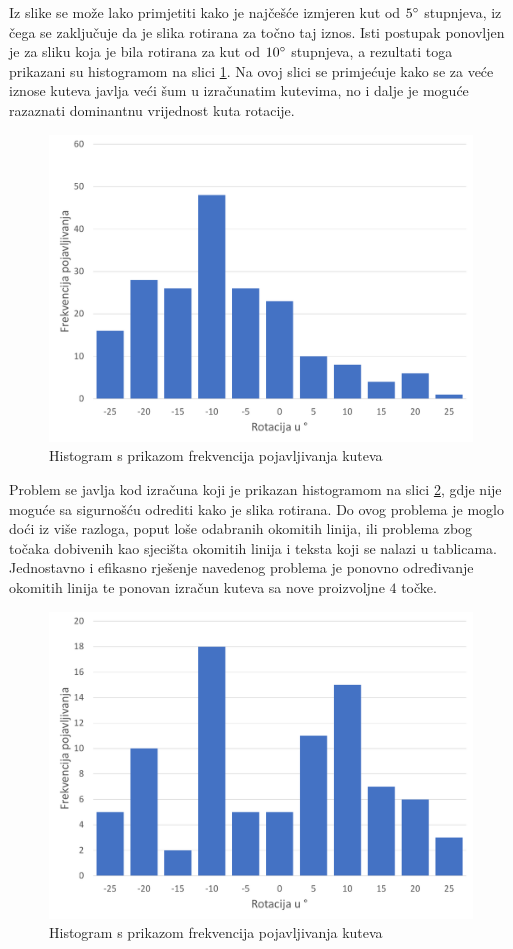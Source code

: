 \documentclass[times, utf8, zavrsni, numeric]{fer}
\begin{document}
Iz slike se može lako primjetiti kako je najčešće izmjeren kut od $5\degree$ stupnjeva, iz čega se zaključuje da je slika rotirana za točno taj iznos.
Isti postupak ponovljen je za sliku koja je bila rotirana za kut od $10\degree$ stupnjeva, a rezultati toga prikazani su histogramom na slici \ref{fig:skew2}.
Na ovoj slici se primjećuje kako se za veće iznose kuteva javlja veći šum u izračunatim kutevima, no i dalje je moguće razaznati dominantnu vrijednost kuta rotacije.\\

\begin{figure}[ht!]
    \centering
    \includegraphics[width=.8\textwidth]{Images/Skew2.pdf}
    \captionsetup{justification=centering}
    \caption{Histogram s prikazom frekvencija pojavljivanja kuteva}
    \label{fig:skew2}
\end{figure}

Problem se javlja kod izračuna koji je prikazan histogramom na slici \ref{fig:skew3}, gdje nije moguće sa sigurnošću odrediti kako je slika rotirana.
Do ovog problema je moglo doći iz više razloga, poput loše odabranih okomitih linija, ili problema zbog točaka dobivenih kao sjecišta okomitih linija i teksta koji se nalazi u tablicama.
Jednostavno i efikasno rješenje navedenog problema je ponovno određivanje okomitih linija te ponovan izračun kuteva sa nove proizvoljne $4$ točke.

\begin{figure}[ht!]
    \centering
    \includegraphics[width=.8\textwidth]{Images/Skew3.pdf}
    \captionsetup{justification=centering}
    \caption{Histogram s prikazom frekvencija pojavljivanja kuteva}
    \label{fig:skew3}
\end{figure}
\end{document}
